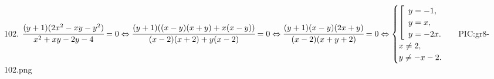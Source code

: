 102. $\cfrac{(y+1)(2x^2-xy-y^2)}{x^2+xy-2y-4}=0\Leftrightarrow \cfrac{(y+1)((x-y)(x+y)+x(x-y))}{(x-2)(x+2)+y(x-2)}=0
\Leftrightarrow \cfrac{(y+1)(x-y)(2x+y)}{(x-2)(x+y+2)}=0\Leftrightarrow\begin{cases}
\left[\begin{array}{l}
y=-1,\\ y=x,\\ y=-2x.\end{array}\right.\\ x\neq2,\\ y\neq-x-2.\end{cases}$
{{PIC:gr8-102.png}}\\
